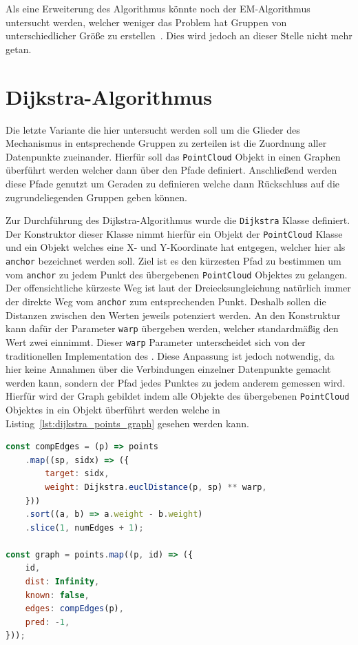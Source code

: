 Als eine Erweiterung des  Algorithmus könnte noch der EM-Algorithmus untersucht werden, welcher weniger das Problem hat Gruppen von unterschiedlicher Grö{\ss}e zu erstellen~\cite[S.~262]{Geron2019}.
Dies wird jedoch an dieser Stelle nicht mehr getan.

\section{Dijkstra-Algorithmus}\label{ch:dijkstra}

Die letzte Variante die hier untersucht werden soll um die Glieder des Mechanismus in entsprechende Gruppen zu zerteilen ist die Zuordnung aller Datenpunkte zueinander.
Hierfür soll das \lstinline{PointCloud} Objekt in einen Graphen überführt werden welcher dann über den  Pfade definiert.
Anschlie{\ss}end werden diese Pfade genutzt um Geraden zu definieren welche dann Rückschluss auf die zugrundeliegenden Gruppen geben können.

Zur Durchführung des Dijkstra-Algorithmus wurde die \lstinline{Dijkstra} Klasse definiert.
Der Konstruktor dieser Klasse nimmt hierfür ein Objekt der \lstinline{PointCloud} Klasse und ein Objekt welches eine X- und Y-Koordinate hat entgegen, welcher hier als \lstinline{anchor} bezeichnet werden soll.
Ziel ist es den kürzesten Pfad zu bestimmen um vom \lstinline{anchor} zu jedem Punkt des übergebenen \lstinline{PointCloud} Objektes zu gelangen.
Der offensichtliche kürzeste Weg ist laut der Dreiecksungleichung natürlich immer der direkte Weg vom \lstinline{anchor} zum entsprechenden Punkt.
Deshalb sollen die Distanzen zwischen den Werten jeweils potenziert werden.
An den Konstruktur kann dafür der Parameter \lstinline{warp} übergeben werden, welcher standardmä{\ss}ig den Wert zwei einnimmt.
Dieser \lstinline{warp} Parameter unterscheidet sich von der traditionellen Implementation des .
Diese Anpassung ist jedoch notwendig, da hier keine Annahmen über die Verbindungen einzelner Datenpunkte gemacht werden kann, sondern der Pfad jedes Punktes zu jedem anderem gemessen wird.
Hierfür wird der Graph gebildet indem alle Objekte des übergebenen \lstinline{PointCloud} Objektes in ein Objekt überführt werden welche in Listing~\ref{lst:dijkstra_points_graph} gesehen werden kann.

\begin{lstlisting}[language=JavaScript, caption={Im \lstinline{Dijkstra} Konstruktor werden die Punkte des übergebenen \lstinline{PointCloud} Objektes in einen Graphen überführt.}, label={lst:dijkstra_points_graph}]
const compEdges = (p) => points
    .map((sp, sidx) => ({
        target: sidx,
        weight: Dijkstra.euclDistance(p, sp) ** warp,
    }))
    .sort((a, b) => a.weight - b.weight)
    .slice(1, numEdges + 1);

const graph = points.map((p, id) => ({
    id,
    dist: Infinity,
    known: false,
    edges: compEdges(p),
    pred: -1,
}));
\end{lstlisting}

